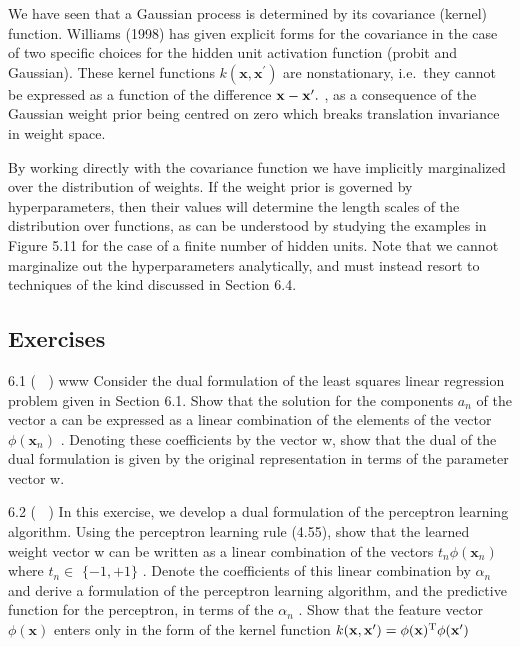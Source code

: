 \documentclass[
  10
]{article}
\begin{document}
We have seen that a Gaussian process is determined by its covariance
(kernel) function. Williams (1998) has given explicit forms for the
covariance in the case of two specific choices for the hidden unit
activation function (probit and Gaussian). These kernel functions
\(k ( \mathbf { x } , \mathbf { x } ^ { \prime } )\) are nonstationary,
i.e.~they cannot be expressed as a function of the difference
\({ \bf x } - { \bf x } ^ { \prime } .\) , as a consequence of the
Gaussian weight prior being centred on zero which breaks translation
invariance in weight space.

By working directly with the covariance function we have implicitly
marginalized over the distribution of weights. If the weight prior is
governed by hyperparameters, then their values will determine the length
scales of the distribution over functions, as can be understood by
studying the examples in Figure 5.11 for the case of a finite number of
hidden units. Note that we cannot marginalize out the hyperparameters
analytically, and must instead resort to techniques of the kind
discussed in Section 6.4.

\subsection{Exercises}\label{exercises-2}

6.1 ( ) www Consider the dual formulation of the least squares linear
regression problem given in Section 6.1. Show that the solution for the
components \(a _ { n }\) of the vector a can be expressed as a linear
combination of the elements of the vector
\(\phi (  { \mathbf { x } } _ { n } )\) . Denoting these coefficients by
the vector w, show that the dual of the dual formulation is given by the
original representation in terms of the parameter vector w.

6.2 ( ) In this exercise, we develop a dual formulation of the
perceptron learning algorithm. Using the perceptron learning rule
(4.55), show that the learned weight vector w can be written as a linear
combination of the vectors \(t _ { n } \phi ( \mathbf x _ { n } )\)
where \(t _ { n } \in\) \(\{ - 1 , + 1 \}\) . Denote the coefficients of
this linear combination by \(\alpha _ { n }\) and derive a formulation
of the perceptron learning algorithm, and the predictive function for
the perceptron, in terms of the \(\alpha _ { n }\) . Show that the
feature vector \(\phi ( \mathbf { x } )\) enters only in the form of the
kernel function
\(k ( { \bf x } , { \bf x } ^ { \prime } ) = \phi ( { \bf x } ) ^ { \mathrm { T } } \phi ( { \bf x } ^ { \prime } )\)
\end{document}

